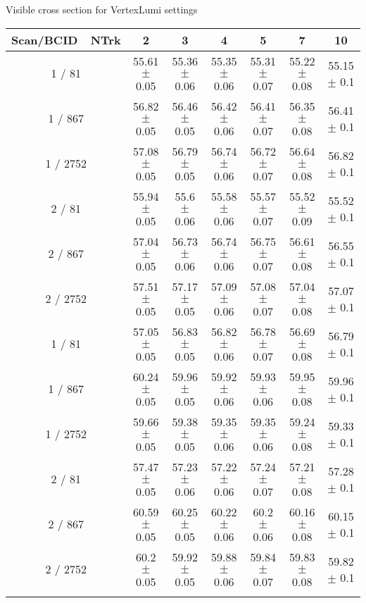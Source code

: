 \documentclass{article}
\begin{document}
\large Visible cross section for VertexLumi settings
\begin{table}
	\scriptsize
	\begin{tabular}{|c|c|c|c|c|c|c|}

		\hline
		Scan/BCID\ \ NTrk & 2& 3& 4& 5& 7& 10 \\
		\hline
		1 / 81 & 55.61 $\pm$ 0.05 & 55.36 $\pm$ 0.06 & 55.35 $\pm$ 0.06 & 55.31 $\pm$ 0.07 & 55.22 $\pm$ 0.08 & 55.15 $\pm$ 0.1\\
		\hline
		1 / 867 & 56.82 $\pm$ 0.05 & 56.46 $\pm$ 0.05 & 56.42 $\pm$ 0.06 & 56.41 $\pm$ 0.07 & 56.35 $\pm$ 0.08 & 56.41 $\pm$ 0.1\\
		\hline
		1 / 2752 & 57.08 $\pm$ 0.05 & 56.79 $\pm$ 0.05 & 56.74 $\pm$ 0.06 & 56.72 $\pm$ 0.07 & 56.64 $\pm$ 0.08 & 56.82 $\pm$ 0.1\\
		\hline
		2 / 81 & 55.94 $\pm$ 0.05 & 55.6 $\pm$ 0.06 & 55.58 $\pm$ 0.06 & 55.57 $\pm$ 0.07 & 55.52 $\pm$ 0.09 & 55.52 $\pm$ 0.1\\
		\hline
		2 / 867 & 57.04 $\pm$ 0.05 & 56.73 $\pm$ 0.06 & 56.74 $\pm$ 0.06 & 56.75 $\pm$ 0.07 & 56.61 $\pm$ 0.08 & 56.55 $\pm$ 0.1\\
		\hline
		2 / 2752 & 57.51 $\pm$ 0.05 & 57.17 $\pm$ 0.05 & 57.09 $\pm$ 0.06 & 57.08 $\pm$ 0.07 & 57.04 $\pm$ 0.08 & 57.07 $\pm$ 0.1\\
		\hline
		1 / 81 & 57.05 $\pm$ 0.05 & 56.83 $\pm$ 0.05 & 56.82 $\pm$ 0.06 & 56.78 $\pm$ 0.07 & 56.69 $\pm$ 0.08 & 56.79 $\pm$ 0.1\\
		\hline
		1 / 867 & 60.24 $\pm$ 0.05 & 59.96 $\pm$ 0.05 & 59.92 $\pm$ 0.06 & 59.93 $\pm$ 0.06 & 59.95 $\pm$ 0.08 & 59.96 $\pm$ 0.1\\
		\hline
		1 / 2752 & 59.66 $\pm$ 0.05 & 59.38 $\pm$ 0.05 & 59.35 $\pm$ 0.06 & 59.35 $\pm$ 0.06 & 59.24 $\pm$ 0.08 & 59.33 $\pm$ 0.1\\
		\hline
		2 / 81 & 57.47 $\pm$ 0.05 & 57.23 $\pm$ 0.06 & 57.22 $\pm$ 0.06 & 57.24 $\pm$ 0.07 & 57.21 $\pm$ 0.08 & 57.28 $\pm$ 0.1\\
		\hline
		2 / 867 & 60.59 $\pm$ 0.05 & 60.25 $\pm$ 0.05 & 60.22 $\pm$ 0.06 & 60.2 $\pm$ 0.06 & 60.16 $\pm$ 0.08 & 60.15 $\pm$ 0.1\\
		\hline
		2 / 2752 & 60.2 $\pm$ 0.05 & 59.92 $\pm$ 0.05 & 59.88 $\pm$ 0.06 & 59.84 $\pm$ 0.07 & 59.83 $\pm$ 0.08 & 59.82 $\pm$ 0.1\\
		\hline
\\
		\hline


	\end{tabular}
\end{table}
\end{document}
